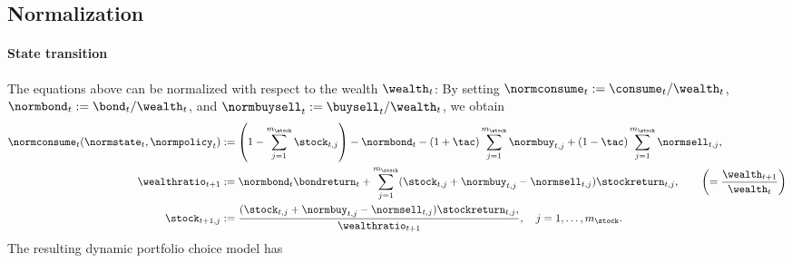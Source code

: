 \subsection{Normalization}

\paragraph{State transition}

The equations above can be normalized with respect to the wealth
$\wealth_t$:
By setting
$\normconsume_t := \consume_t/\wealth_t$,
$\normbond_t    := \bond_t   /\wealth_t$, and
$\normbuysell_t := \buysell_t/\wealth_t$, we obtain
\begin{subequations}
  \begin{align}
    \normconsume_t(\normstate_t, \normpolicy_t)
    &:= \paren*{1 - \sum_{j=1}^{m_{\stock}} \stock_{t,j}} - \normbond_t -
    (1 + \tac) \sum_{j=1}^{m_{\stock}} \normbuy_{t,j} +
    (1 - \tac) \sum_{j=1}^{m_{\stock}} \normsell_{t,j},\\
    \wealthratio_{t+1}
    &:= \normbond_t \bondreturn_t + \sum_{j=1}^{m_{\stock}}
    (\stock_{t,j} + \normbuy_{t,j} - \normsell_{t,j}) \stockreturn_{t,j},
    \qquad\left(= \frac{\wealth_{t+1}}{\wealth_t}\right)\\
    \stock_{t+1,j}
    &:= \frac{
      (\stock_{t,j} + \normbuy_{t,j} - \normsell_{t,j}) \stockreturn_{t,j},
    }{\wealthratio_{t+1}},\quad
    j = 1, \dotsc, m_{\stock}.
  \end{align}
\end{subequations}
The resulting dynamic portfolio choice model has
